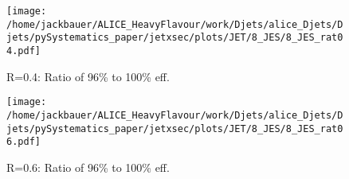 \begin{figure}
\centering
\begin{minipage}{.5\textwidth}
  \centering
  \texttt{[image: /home/jackbauer/ALICE\_HeavyFlavour/work/Djets/alice\_Djets/Djets/pySystematics\_paper/jetxsec/plots/JET/8\_JES/8\_JES\_rat04.pdf]}
  \caption{R=0.4: Ratio of 96\% to 100\% eff.}
  \label{fig:JESsysUncR04}
\end{minipage}%
\begin{minipage}{.5\textwidth}
  \centering
  \texttt{[image: /home/jackbauer/ALICE\_HeavyFlavour/work/Djets/alice\_Djets/Djets/pySystematics\_paper/jetxsec/plots/JET/8\_JES/8\_JES\_rat06.pdf]}
  \caption{R=0.6: Ratio of 96\% to 100\% eff.}
  \label{fig:JESsysUncR06}
\end{minipage}
\end{figure}
